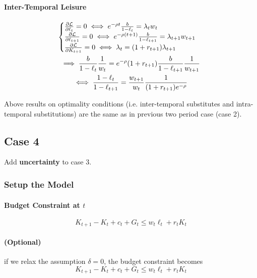 \documentclass[11pt]{article}
\begin{document}
			\paragraph{Inter-Temporal Leisure}
				\begin{gather}
					\begin{cases}
						\frac{\partial{\mathcal{{L}}}}{\partial{\ell_t}} = 0 \iff e^{-\rho t} \frac{b}{1-\ell_t} = \lambda_t w_t \\
						\frac{\partial{\mathcal{{L}}}}{\partial{\ell_{t+1}}} = 0 \iff e^{-\rho (t+1)} \frac{b}{1-\ell_{t+1}} = \lambda_{t+1} w_{t+1} \\
						\frac{\partial{\mathcal{{L}}}}{\partial{K_{t+1}}} = 0 \iff \lambda_t = (1+r_{t+1})\lambda_{t+1}
					\end{cases}\\
					\implies \frac{b}{1-\ell_t} \frac{1}{w_t} = e^{-\rho} (1+r_{t+1}) \frac{b}{1-\ell_{t+1}}\frac{1}{w_{t+1}} \\
					\iff \frac{1-\ell_{t}}{1-\ell_{t+1}} = \frac{w_{t+1}}{w_{t}} \frac{1}{(1+r_{t+1}) e^{-\rho}}
				\end{gather}
			\begin{remark}
				Above results on optimality conditions (i.e. inter-temporal substitutes and intra-temporal substitutions) are the same as in previous two period case (case 2).
			\end{remark}	
		\subsection{Case 4}
			\begin{assumption}
				Add \textbf{uncertainty} to case 3.
			\end{assumption}
		\subsubsection{Setup the Model}
			\paragraph{Budget Constraint at $t$}
			\begin{equation}
				K_{t+1} - K_t + c_t + G_t \leq w_t \ell_t + r_t K_t
			\end{equation}
			\paragraph{(Optional)} if we relax the assumption $\delta = 0$, the budget constraint becomes
			\begin{equation}
				K_{t+1} - K_t + c_t + G_t \leq w_t \ell_t + r_t K_t
			\end{equation}
\end{document}
